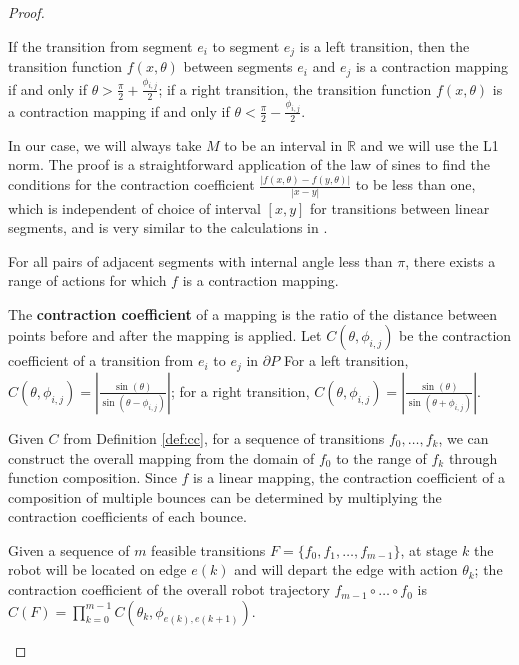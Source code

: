 \documentclass[]{styles/svproc}  %
\begin{document}
\begin{proof}
\begin{lemma} \label{lemma:angrange}
If the transition from segment $e_i$ to segment $e_j$ is a left transition, then the
transition function $f(x, \theta)$ between segments $e_i$ and $e_j$ is a contraction
mapping if and only if $\theta > \frac{\pi}{2}+\frac{\phi_{i, j}}{2}$;
if a right transition, the transition function $f(x, \theta)$ is a contraction mapping if
and only if $\theta < \frac{\pi}{2}-\frac{\phi_{i, j}}{2}$.
\end{lemma}

In our case, we will always take $M$ to be an interval in $\mathbb{R}$ and we
will use the L1 norm. The proof is a straightforward application of the law of
sines to find the conditions for the contraction coefficient $\frac{ | f(x,\theta)-f(y,\theta)
|}{|x-y|}$ to be less than one, which is independent of choice of interval $[x, y]$ for transitions between linear
segments, and is very similar to the calculations in \cite{NilBecLav17}.

\begin{corollary} \label{coro:existcontract}
For all pairs of adjacent 
segments with internal angle less than $\pi$,
there exists a range of actions for which $f$ is a contraction mapping.
\end{corollary}

\begin{definition} \label{def:cc}
The \textbf{contraction coefficient} of a mapping is the ratio of the distance between points before and after
the mapping is applied.
Let $C(\theta, \phi_{i, j})$ be the contraction coefficient of a transition from $e_i$ to $e_j$ in $\partial P$
For a left transition, $C(\theta, \phi_{i, j}) = | \frac{\sin(\theta)}{\sin(\theta - \phi_{i, j})} |$; 
for a right transition,  $C(\theta, \phi_{i, j}) = | \frac{\sin(\theta)}{\sin(\theta + \phi_{i, j})} |$.
\end{definition}

Given $C$ from Definition \ref{def:cc}, for a sequence of transitions $f_0, \ldots, f_k$, 
we can construct the overall mapping from the domain of $f_0$ to the range of $f_k$ through function
composition. Since $f$ is a linear mapping, the contraction coefficient of a composition 
of multiple bounces can be determined by multiplying the contraction
coefficients of each bounce.

\begin{definition} \label{def:c}
Given a sequence of $m$ feasible transitions $F = \{f_0, f_1, \ldots, f_{m-1}\}$, at stage $k$ the robot 
will be located on edge $e(k)$ and will depart the edge with
action $\theta_k$; the contraction coefficient of the overall robot
trajectory $f_{m-1} \circ \ldots \circ f_0$ is $C(F) = \prod_{k=0}^{m-1} C(\theta_{k}, \phi_{e(k), e(k+1)})$.
\end{definition}


\end{proof}
\end{document}
